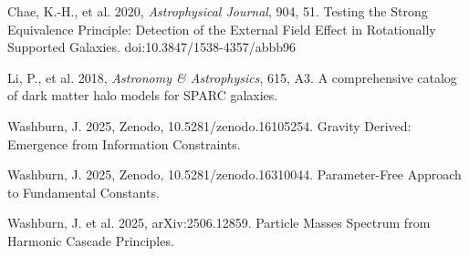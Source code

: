 \documentclass[12pt,a4paper]{article}
\begin{document}
\begin{thebibliography}{99}
 Chae, K.-H., et al. 2020, \textit{Astrophysical Journal}, 904, 51. Testing the Strong Equivalence Principle: Detection of the External Field Effect in Rotationally Supported Galaxies. doi:10.3847/1538-4357/abbb96

 Li, P., et al. 2018, \textit{Astronomy \& Astrophysics}, 615, A3. A comprehensive catalog of dark matter halo models for SPARC galaxies.

 Washburn, J. 2025, Zenodo, 10.5281/zenodo.16105254. Gravity Derived: Emergence from Information Constraints.

 Washburn, J. 2025, Zenodo, 10.5281/zenodo.16310044. Parameter-Free Approach to Fundamental Constants.

 Washburn, J. et al. 2025, arXiv:2506.12859. Particle Masses Spectrum from Harmonic Cascade Principles.

\end{thebibliography}
\end{document}
